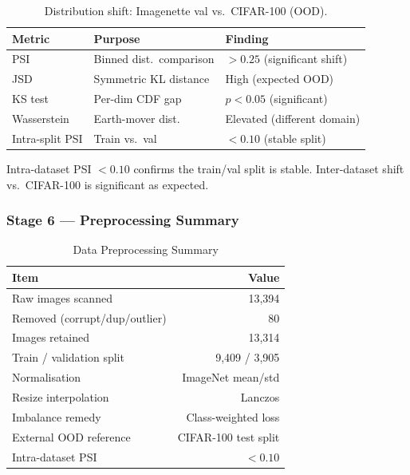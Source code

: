 \documentclass[conference]{IEEEtran}
\begin{document}
\begin{table}[htbp]
\caption{Distribution shift: Imagenette val vs.\ CIFAR-100 (OOD).}
\label{tab:shift}
\centering
\scriptsize
\begin{tabular}{lll}
\toprule
\textbf{Metric} & \textbf{Purpose} & \textbf{Finding} \\
\midrule
PSI & Binned dist.\ comparison & $>0.25$ (significant shift) \\
JSD & Symmetric KL distance    & High (expected OOD) \\
KS test & Per-dim CDF gap      & $p<0.05$ (significant) \\
Wasserstein & Earth-mover dist.\ & Elevated (different domain) \\
\midrule
Intra-split PSI & Train vs.\ val & $<0.10$ (stable split) \\
\bottomrule
\end{tabular}
\end{table}

Intra-dataset PSI $< 0.10$ confirms the train/val split is stable.
Inter-dataset shift vs.\ CIFAR-100 is significant as expected.

\subsubsection{Stage 6 --- Preprocessing Summary}

\begin{table}[htbp]
\caption{Data Preprocessing Summary}
\label{tab:eda_summary}
\centering
\scriptsize
\begin{tabular}{lr}
\toprule
\textbf{Item} & \textbf{Value} \\
\midrule
Raw images scanned             & 13,394 \\
Removed (corrupt/dup/outlier)  & 80 \\
Images retained                & 13,314 \\
Train / validation split       & 9,409 / 3,905 \\
Normalisation                  & ImageNet mean/std \\
Resize interpolation           & Lanczos \\
Imbalance remedy               & Class-weighted loss \\
External OOD reference         & CIFAR-100 test split \\
Intra-dataset PSI              & $< 0.10$ \\
\bottomrule
\end{tabular}
\end{table}
\end{document}
